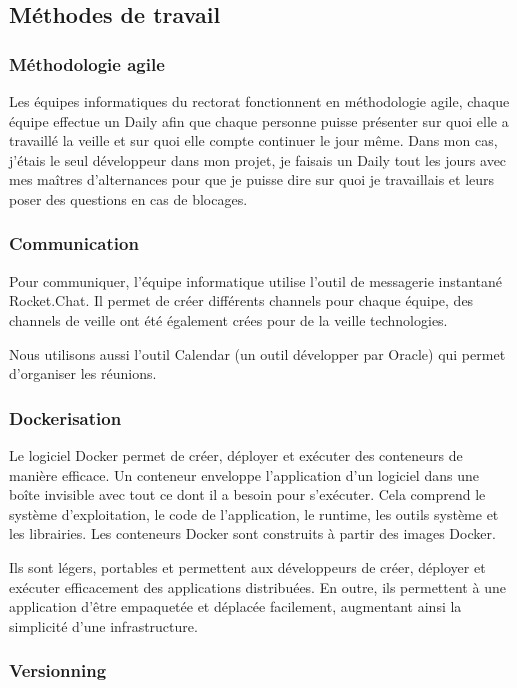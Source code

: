 \documentclass[12pt]{article}
\begin{document}
\subsection{Méthodes de travail}
\subsubsection{Méthodologie agile}

Les équipes informatiques du rectorat fonctionnent en méthodologie agile, chaque équipe effectue un Daily afin que chaque personne puisse présenter sur quoi elle a travaillé la veille et sur quoi elle compte continuer le jour même. Dans mon cas, j'étais le seul développeur dans mon projet, je faisais un Daily tout les jours avec mes maîtres d'alternances pour que je puisse dire sur quoi je travaillais et leurs poser des questions en cas de blocages. 

\subsubsection{Communication}

Pour communiquer, l'équipe informatique utilise l'outil de messagerie instantané Rocket.Chat. Il permet de créer différents
channels pour chaque équipe, des channels de veille ont été également crées pour de la veille technologies.

Nous utilisons aussi l'outil Calendar (un outil développer par Oracle) qui permet d’organiser les réunions.  

\subsubsection{Dockerisation}

Le logiciel Docker permet de créer, déployer et exécuter des conteneurs de manière efficace. Un conteneur enveloppe l’application d’un logiciel dans une boîte invisible avec tout ce dont il a besoin pour s’exécuter. Cela comprend le système d’exploitation, le code de l’application, le runtime, les outils système et les librairies. Les conteneurs Docker sont construits à partir des images Docker.

Ils sont légers, portables et permettent aux développeurs de créer, déployer et exécuter efficacement des applications distribuées. En outre, ils permettent à une application d’être empaquetée et déplacée facilement, augmentant ainsi la simplicité d’une infrastructure.

\subsubsection{Versionning}
\end{document}
